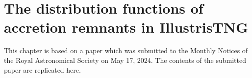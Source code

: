 \chapter{The distribution functions of accretion remnants in IllustrisTNG}

This chapter is based on a paper which was submitted to the Monthly Notices of the Royal Astronomical Society on May 17, 2024. The contents of the submitted paper are replicated here.

